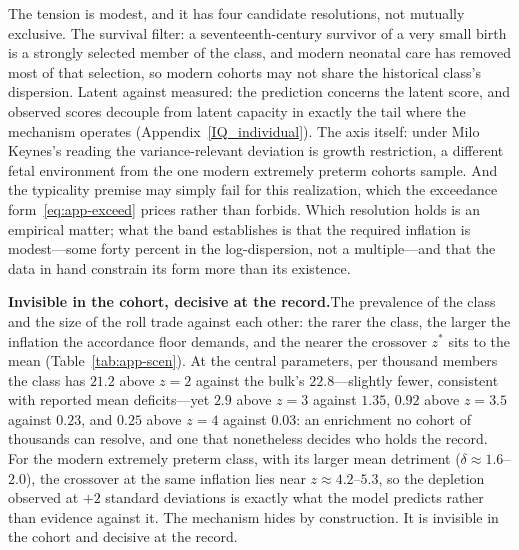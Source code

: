 \documentclass{article}
\begin{document}
The tension is modest, and it has four candidate resolutions, not mutually exclusive. The survival filter: a seventeenth-century survivor of a very small birth is a strongly selected member of the class, and modern neonatal care has removed most of that selection, so modern cohorts may not share the historical class's dispersion. Latent against measured: the prediction concerns the latent score, and observed scores decouple from latent capacity in exactly the tail where the mechanism operates (Appendix~\ref{IQ_individual}). The axis itself: under Milo Keynes's reading the variance-relevant deviation is growth restriction, a different fetal environment from the one modern extremely preterm cohorts sample. And the typicality premise may simply fail for this realization, which the exceedance form~\eqref{eq:app-exceed} prices rather than forbids. Which resolution holds is an empirical matter; what the band establishes is that the required inflation is modest---some forty percent in the log-dispersion, not a multiple---and that the data in hand constrain its form more than its existence.


\par\medskip\noindent\textbf{Invisible in the cohort, decisive at the record.}\enspace The prevalence of the class and the size of the roll trade against each other: the rarer the class, the larger the inflation the accordance floor demands, and the nearer the crossover $z^{\ast}$ sits to the mean (Table~\ref{tab:app-scen}). At the central parameters, per thousand members the class has $21.2$ above $z = 2$ against the bulk's $22.8$---slightly fewer, consistent with reported mean deficits---yet $2.9$ above $z = 3$ against $1.35$, $0.92$ above $z = 3.5$ against $0.23$, and $0.25$ above $z = 4$ against $0.03$: an enrichment no cohort of thousands can resolve, and one that nonetheless decides who holds the record. For the modern extremely preterm class, with its larger mean detriment ($\delta \approx 1.6$--$2.0$), the crossover at the same inflation lies near $z \approx 4.2$--$5.3$, so the depletion observed at $+2$ standard deviations is exactly what the model predicts rather than evidence against it. The mechanism hides by construction. It is invisible in the cohort and decisive at the record.
\end{document}
